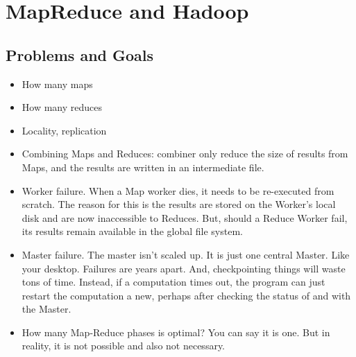 \chapter{MapReduce and Hadoop}

\section{Problems and Goals}
\begin{itemize}
    \item How many maps
    \item How many reduces
    \item Locality, replication
    \item Combining Maps and Reduces: combiner only reduce the size of results from Maps, and the results are written in an intermediate file. 
    \item Worker failure. When a Map worker dies, it needs to be re-executed from scratch. The reason for this is the results are stored on the Worker's local disk and are now inaccessible to Reduces. But, should a Reduce Worker fail, its results remain available in the global file system.
    \item Master failure. The master isn't scaled up. It is just one central Master. Like your desktop. Failures are years apart. And, checkpointing things will waste tons of time. Instead, if a computation times out, the program can just restart the computation a new, perhaps after checking the status of and with the Master.
    \item How many Map-Reduce phases is optimal? You can say it is one. But in reality, it is not possible and also not necessary.
\end{itemize}